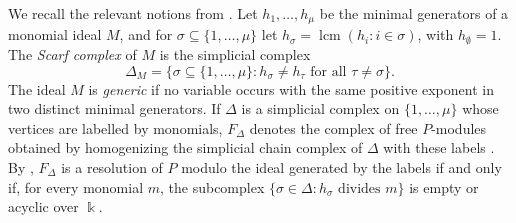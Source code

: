 \documentclass{amsart}
\theoremstyle{definition}
\theoremstyle{remark}
\numberwithin{equation}{section}
\newcommand{\kk}{\Bbbk}
\DeclareMathOperator{\lcm}{lcm}
\begin{document}
We recall the relevant notions from \cite{BPS98}. Let $h_1,\dots,h_\mu$ be the minimal generators of a monomial ideal $M$, and for $\sigma\subseteq\{1,\dots,\mu\}$ let $h_\sigma=\lcm(h_i : i\in\sigma)$, with $h_\emptyset=1$. The \emph{Scarf complex} of $M$ is the simplicial complex
\[
\Delta_M=\{\sigma\subseteq\{1,\dots,\mu\} : h_\sigma\neq h_\tau \text{ for all } \tau\neq\sigma\}.
\]
The ideal $M$ is \emph{generic} if no variable occurs with the same positive exponent in two distinct minimal generators. If $\Delta$ is a simplicial complex on $\{1,\dots,\mu\}$ whose vertices are labelled by monomials, $F_\Delta$ denotes the complex of free $P$-modules obtained by homogenizing the simplicial chain complex of $\Delta$ with these labels \cite[Construction~2.1]{BPS98}. By \cite[Lemma~2.2]{BPS98}, $F_\Delta$ is a resolution of $P$ modulo the ideal generated by the labels if and only if, for every monomial $m$, the subcomplex $\{\sigma\in\Delta : h_\sigma \text{ divides } m\}$ is empty or acyclic over $\kk$.
\end{document}
